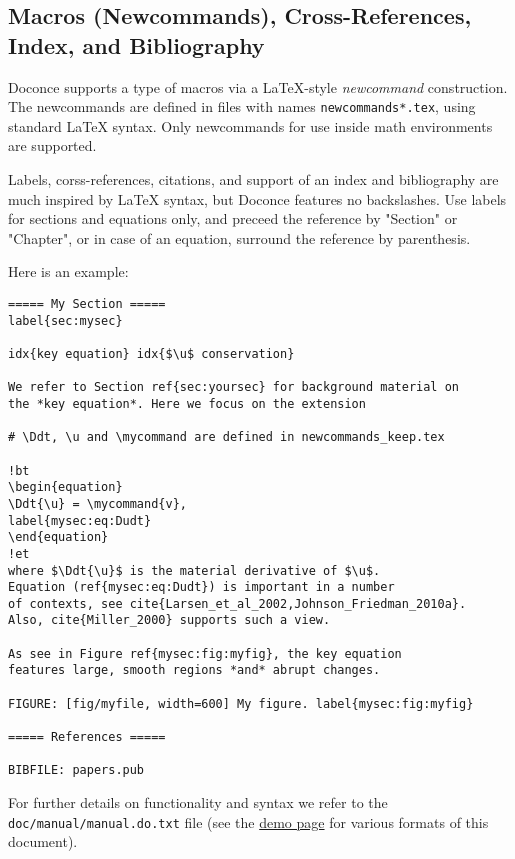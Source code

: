 \documentclass[%
oneside,                 %
final,                   %
10pt]{article}
\begin{document}
\subsection{Macros (Newcommands), Cross-References, Index, and Bibliography}
\label{newcommands}

Doconce supports a type of macros via a LaTeX-style \emph{newcommand}
construction.  The newcommands are defined in files with names
{\fontsize{10pt}{10pt}\Verb!newcommands*.tex!}, using standard {\LaTeX} syntax. Only newcommands
for use inside math environments are supported.

Labels, corss-references, citations, and support of an index and
bibliography are much inspired by {\LaTeX} syntax, but Doconce features
no backslashes. Use labels for sections and equations only, and
preceed the reference by "Section" or "Chapter", or in case of
an equation, surround the reference by parenthesis.

Here is an example:

\begin{Verbatim}[fontsize=\fontsize{9pt}{9pt},tabsize=8,baselinestretch=0.85,
fontfamily=tt,xleftmargin=7mm]
===== My Section =====
label{sec:mysec}

idx{key equation} idx{$\u$ conservation}

We refer to Section ref{sec:yoursec} for background material on
the *key equation*. Here we focus on the extension

# \Ddt, \u and \mycommand are defined in newcommands_keep.tex

!bt
\begin{equation}
\Ddt{\u} = \mycommand{v},
label{mysec:eq:Dudt}
\end{equation}
!et
where $\Ddt{\u}$ is the material derivative of $\u$.
Equation (ref{mysec:eq:Dudt}) is important in a number
of contexts, see cite{Larsen_et_al_2002,Johnson_Friedman_2010a}.
Also, cite{Miller_2000} supports such a view.

As see in Figure ref{mysec:fig:myfig}, the key equation
features large, smooth regions *and* abrupt changes.

FIGURE: [fig/myfile, width=600] My figure. label{mysec:fig:myfig}

===== References =====

BIBFILE: papers.pub
\end{Verbatim}
\noindent

For further details on functionality and
syntax we refer to the {\fontsize{10pt}{10pt}\Verb!doc/manual/manual.do.txt!} file (see the
\href{{https://doconce.googlecode.com/hg/doc/demos/manual/index.html}}{demo page}
for various formats of this document).
\end{document}
